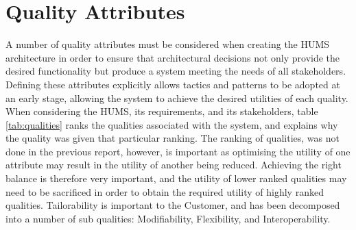 \documentclass[10pt,a4paper]{article}
\begin{document}
\section{Quality Attributes}
\label{sec:qualities}
A number of quality attributes must be considered when creating the HUMS architecture in order to ensure that architectural decisions not only provide the desired functionality but produce a system meeting the needs of all stakeholders.
Defining these attributes explicitly allows tactics and patterns to be adopted at an early stage, allowing the system to achieve the desired utilities of each quality. 
When considering the HUMS, its requirements, and its stakeholders, table \ref{tab:qualities} ranks the qualities associated with the system, and explains why the quality was given that particular ranking. The ranking of qualities, was not done in the previous report, however,  is important as optimising the utility of one attribute may result in the utility of another being reduced. Achieving the right balance is therefore very important, and the utility of lower ranked qualities may need to be sacrificed in order to obtain the required utility of highly ranked qualities. Tailorability is important to the Customer, and has been decomposed into a number of sub qualities: Modifiability, Flexibility, and Interoperability.
\end{document}
